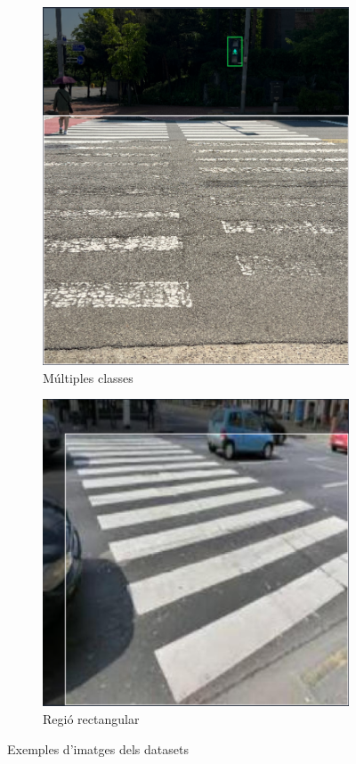 \documentclass[10pt,a4paper,twocolumn,twoside]{article}
\begin{document}
\begin{figure}[!h]
	\centering
	\begin{subfigure}{0.4\columnwidth}
		\includegraphics[width=\linewidth]{figs/1}
		\caption{Múltiples classes}
		\label{fig:classes}
	\end{subfigure}
	\quad
	\begin{subfigure}{0.46\columnwidth}
		\includegraphics[width=\linewidth]{figs/2}
		\caption{Regió rectangular}
		\label{fig:regio}
	\end{subfigure}
	\caption{Exemples d'imatges dels datasets \cite{RoboflowJuly6, RoboflowCapstone, RoboflowAugmented}}
\end{figure}
\end{document}
